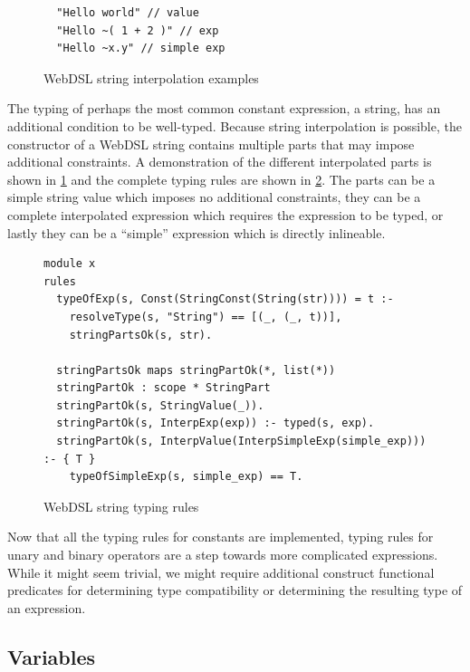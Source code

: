       \begin{figure}
        \capstart
        \begin{verbatim}
  "Hello world" // value
  "Hello ~( 1 + 2 )" // exp
  "Hello ~x.y" // simple exp
        \end{verbatim}
        \caption{\label{fig:statix-webdsl-string-interpolation-example}WebDSL string interpolation examples}
      \end{figure}

      The typing of perhaps the most common constant expression, a string, has an additional condition to be well-typed. Because string interpolation is possible, the constructor of a WebDSL string contains multiple parts that may impose additional constraints. A demonstration of the different interpolated parts is shown in \cref{fig:statix-webdsl-string-interpolation-example} and the complete typing rules are shown in \cref{fig:webdsl-basics-built-in-types-string}. The parts can be a simple string value which imposes no additional constraints, they can be a complete interpolated expression which requires the expression to be typed, or lastly they can be a ``simple'' expression which is directly inlineable.

      \begin{figure}
        \begin{verbatim}
module x
rules
  typeOfExp(s, Const(StringConst(String(str)))) = t :-
    resolveType(s, "String") == [(_, (_, t))],
    stringPartsOk(s, str).

  stringPartsOk maps stringPartOk(*, list(*))
  stringPartOk : scope * StringPart
  stringPartOk(s, StringValue(_)).
  stringPartOk(s, InterpExp(exp)) :- typed(s, exp).
  stringPartOk(s, InterpValue(InterpSimpleExp(simple_exp))) :- { T }
    typeOfSimpleExp(s, simple_exp) == T.
        \end{verbatim}
        \caption{\label{fig:webdsl-basics-built-in-types-string}WebDSL string typing rules}
      \end{figure}

      Now that all the typing rules for constants are implemented, typing rules for unary and binary operators are a step towards more complicated expressions. While it might seem trivial, we might require additional construct functional predicates for determining type compatibility or determining the resulting type of an expression.

    \subsection{\label{subsec:simple-variables}Variables}

